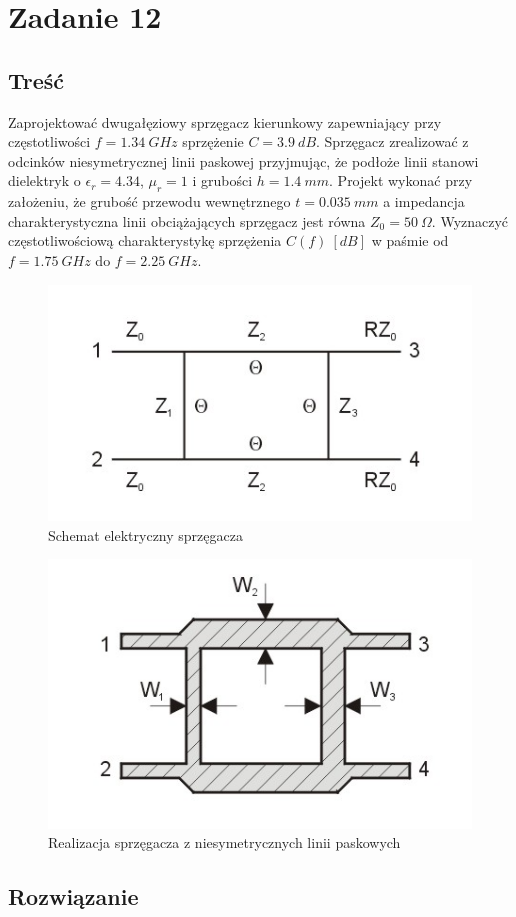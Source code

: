 \documentclass[rep.tex]{subfiles}
\begin{document}
\chapter{Zadanie 12}
\label{zad12}
\section{Treść}
Zaprojektować dwugałęziowy sprzęgacz kierunkowy zapewniający przy częstotliwości $f = 1.34~GHz$ sprzężenie $C = 3.9~dB$.
Sprzęgacz zrealizować z odcinków niesymetrycznej linii paskowej przyjmując, że podłoże linii stanowi dielektryk o $\epsilon_r = 4.34$, $\mu_r = 1$ i grubości $h = 1.4~mm$.
Projekt wykonać przy założeniu, że grubość przewodu wewnętrznego $t = 0.035~mm$ a impedancja charakterystyczna linii obciążających sprzęgacz jest równa $Z_0 = 50~\Omega$.
Wyznaczyć częstotliwościową charakterystykę sprzężenia $C(f)~[dB]$ w paśmie od $f = 1.75~GHz$ do $f = 2.25~GHz$.

\begin{figure}[!htbp]
  \centering
  \includegraphics[width=0.5\linewidth]{fig/zad12/coupler_1}
  \caption{Schemat elektryczny sprzęgacza}
  \label{fig:zad12:coupler1}
\end{figure}

\begin{figure}[!htbp]
  \centering
  \includegraphics[width=0.5\linewidth]{fig/zad12/coupler_2}
  \caption{Realizacja sprzęgacza z niesymetrycznych linii paskowych}
  \label{fig:zad12:coupler2}
\end{figure}

\section{Rozwiązanie}
\end{document}
